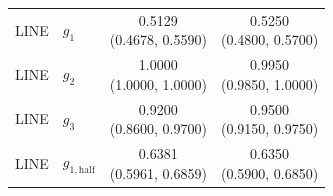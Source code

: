 \begin{tabular}{llcc}
LINE & $g_1$ & \shortstack{0.5129\\(0.4678, 0.5590)} & \shortstack{0.5250\\(0.4800, 0.5700)} \\[3pt]
LINE & $g_2$ & \shortstack{1.0000\\(1.0000, 1.0000)} & \shortstack{0.9950\\(0.9850, 1.0000)} \\[3pt]
LINE & $g_3$ & \shortstack{0.9200\\(0.8600, 0.9700)} & \shortstack{0.9500\\(0.9150, 0.9750)} \\[3pt]
LINE & $g_{1,\mathrm{half}}$ & \shortstack{0.6381\\(0.5961, 0.6859)} & \shortstack{0.6350\\(0.5900, 0.6850)} \\[3pt]
\bottomrule
\end{tabular}
